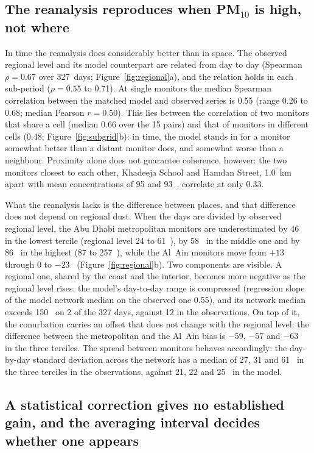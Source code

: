\subsection{The reanalysis reproduces when PM$_{10}$ is high, not where}
\label{sec:res-when}

In time the reanalysis does considerably better than in space. The observed regional level and
its model counterpart are related from day to day (Spearman $\rho=0.67$ over 327~days;
Figure~\ref{fig:regional}a), and the relation holds in each sub-period ($\rho=0.55$ to 0.71). At
single monitors the median Spearman correlation between the matched model and observed series is
0.55 (range 0.26 to 0.68; median Pearson $r=0.50$). This lies between the correlation of two
monitors that share a cell (median 0.66 over the 15 pairs) and that of monitors in different cells
(0.48; Figure~\ref{fig:subgrid}b): in time, the model stands in for a monitor somewhat better than
a distant monitor does, and somewhat worse than a neighbour. Proximity alone does not guarantee
coherence, however: the two monitors closest to each other, Khadeeja School and Hamdan Street,
1.0~km apart with mean concentrations of 95 and 93~\ugm{}, correlate at only 0.33.

What the reanalysis lacks is the difference between places, and that difference does not depend
on regional dust. When the days are divided by observed regional level, the Abu Dhabi
metropolitan monitors are underestimated by 46~\ugm{} in the lowest tercile (regional level 24 to
61~\ugm{}), by 58~\ugm{} in the middle one and by 86~\ugm{} in the highest (87 to 257~\ugm{}),
while the Al~Ain monitors move from $+13$ through 0 to $-23$~\ugm{}
(Figure~\ref{fig:regional}b). Two components are visible. A regional one, shared by the coast and
the interior, becomes more negative as the regional level rises: the model's day-to-day range is
compressed (regression slope of the model network median on the observed one 0.55), and its
network median exceeds 150~\ugm{} on 2 of the 327 days, against 12 in the observations. On top
of it, the conurbation carries an offset that does not change with the regional level: the
difference between the metropolitan and the Al~Ain bias is $-59$, $-57$ and $-63$~\ugm{} in the
three terciles. The spread between monitors behaves accordingly: the day-by-day standard
deviation across the network has a median of 27, 31 and 61~\ugm{} in the three terciles in the
observations, against 21, 22 and 25~\ugm{} in the model.

\subsection{A statistical correction gives no established gain, and the averaging interval
decides whether one appears}
\label{sec:res-transfer}

